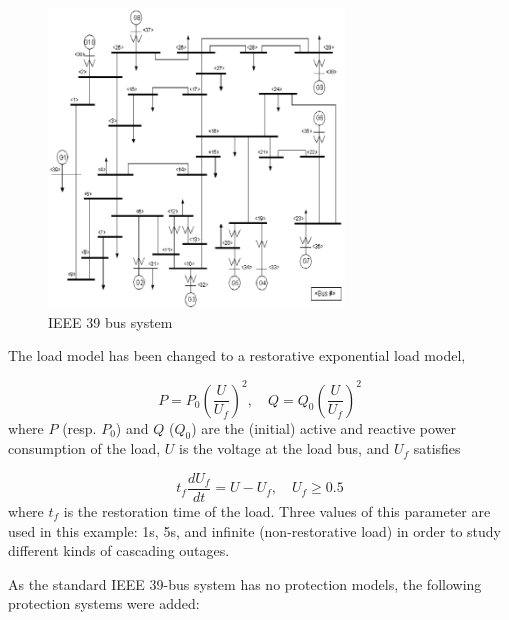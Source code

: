 \begin{figure}
    \centering
    \includegraphics[width=0.7\textwidth]{Figs/IEEE39.png}
    \caption{IEEE 39 bus system~\cite{IEEE39figure}}
    \label{fig:IEEE39}
\end{figure}

The load model has been changed to a restorative exponential load model, \ie

\begin{equation}
\label{eq:restorative_load_model_1}
P = P_0 \left(\frac{U}{U_f}\right)^2, \quad Q = Q_0 \left(\frac{U}{U_f}\right)^2
\end{equation}
\noindent where \(P\) (resp. \(P_0\)) and \(Q\) (\(Q_0\)) are the (initial) active and reactive power consumption of the load, \(U\) is the voltage at the load bus, and \(U_f\) satisfies

\begin{equation}
\label{eq:restorative_load_model_2}
t_f \frac{dU_f}{dt} = U - U_f, \quad U_f \ge 0.5
\end{equation}
\noindent where \(t_f\) is the restoration time of the load. Three values of this parameter are used in this example: 1s, 5s, and infinite (\ie non-restorative load) in order to study different kinds of cascading outages.

As the standard IEEE 39-bus system has no protection models, the following protection systems were added:

